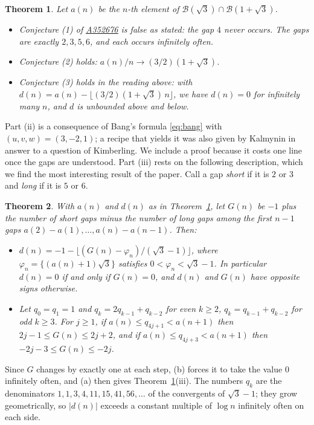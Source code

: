 \documentclass[12pt]{article}
\newcommand{\seqnum}[1]{\href{https://oeis.org/#1}{\underline{#1}}}
\newcommand{\fl}[1]{\lfloor #1 \rfloor}
\newcommand{\B}{\mathcal{B}}
\theoremstyle{plain}
\newtheorem{theorem}{Theorem}
\theoremstyle{remark}
\begin{document}
\begin{theorem}\label{thm:a352676}
Let $a(n)$ be the $n$-th element of $\B(\sqrt3)\cap\B(1+\sqrt3)$.
\begin{itemize}
\item[(i)] Conjecture (1) of \seqnum{A352676} is false as stated: the gap $4$ never occurs. The
gaps are exactly $2,3,5,6$, and each occurs infinitely often.
\item[(ii)] Conjecture (2) holds: $a(n)/n\to(3/2)(1+\sqrt3)$.
\item[(iii)] Conjecture (3) holds in the reading above: with
$d(n)=a(n)-\fl{(3/2)(1+\sqrt3)\,n}$, we have $d(n)=0$ for infinitely many $n$, and $d$ is
unbounded above and below.
\end{itemize}
\end{theorem}

Part (ii) is a consequence of Bang's formula \eqref{eq:bang} with $(u,v,w)=(3,-2,1)$; a
recipe that yields it was also given by Kalmynin \cite{kalmynin} in answer to a question of
Kimberling. We include a proof because it costs one line once the gaps are understood. Part
(iii) rests on the following description, which we find the most interesting result of the
paper. Call a gap \emph{short} if it is $2$ or $3$ and \emph{long} if it is $5$ or $6$.

\begin{theorem}\label{thm:walk}
With $a(n)$ and $d(n)$ as in Theorem~\ref{thm:a352676}, let $G(n)$ be $-1$ plus the number of
short gaps minus the number of long gaps among the first $n-1$ gaps
$a(2)-a(1),\dots,a(n)-a(n-1)$. Then:
\begin{itemize}
\item[(a)] $d(n)=-1-\bigl\lfloor (G(n)-\varphi_n)/(\sqrt3-1)\bigr\rfloor$, where
$\varphi_n=\{(a(n)+1)\sqrt3\}$ satisfies $0<\varphi_n<\sqrt3-1$. In particular $d(n)=0$ if and
only if $G(n)=0$, and $d(n)$ and $G(n)$ have opposite signs otherwise.
\item[(b)] Let $q_0=q_1=1$ and $q_k=2q_{k-1}+q_{k-2}$ for even $k\ge2$,
$q_k=q_{k-1}+q_{k-2}$ for odd $k\ge3$. For $j\ge1$, if $a(n)\le q_{4j+1}<a(n+1)$ then
$2j-1\le G(n)\le 2j+2$, and if $a(n)\le q_{4j+3}<a(n+1)$ then $-2j-3\le G(n)\le -2j$.
\end{itemize}
\end{theorem}

Since $G$ changes by exactly one at each step, (b) forces it to take the value $0$ infinitely
often, and (a) then gives Theorem~\ref{thm:a352676}(iii). The numbers $q_k$ are the denominators
$1,1,3,4,11,15,41,56,\dots$ of the convergents of $\sqrt3-1$; they grow geometrically, so
$|d(n)|$ exceeds a constant multiple of $\log n$ infinitely often on each side.
\end{document}
